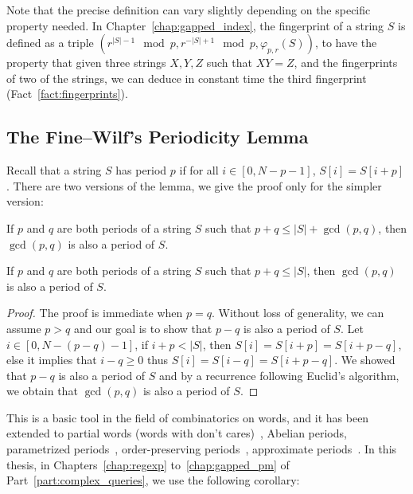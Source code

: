 Note that the precise definition can vary slightly depending on the specific property needed. In Chapter~\ref{chap:gapped_index}, the fingerprint of a string $S$ is defined as a triple $(r^{|S|-1} \mod p, r^{-|S|+1} \mod p, \varphi_{p,r}(S))$, to have the property that given three strings $X,Y,Z$ such that $XY =Z$, and the fingerprints of two of the strings, we can deduce in constant time the third fingerprint (Fact~\ref{fact:fingerprints}). 


\subsection{The Fine--Wilf's Periodicity Lemma}\label{sec:prelim:FW}

Recall that a string $S$ has period $p$ if for all $i \in [0,N-p-1]$, $S[i]=S[i+p]$. There are two versions of the lemma, we give the proof only for the simpler version:

\begin{lemma*}
If $p$ and $q$ are both periods of a string $S$ such that $p+q \leq |S|+\gcd(p,q)$, then $\gcd(p,q)$ is also a period of $S$.
\end{lemma*}

\begin{lemma*}
    If $p$ and $q$ are both periods of a string $S$ such that $p+q \leq |S|$, then $\gcd(p,q)$ is also a period of $S$.
\end{lemma*}
\begin{proof}
    The proof is immediate when $p=q$. Without loss of generality, we can assume $p > q$ and our goal is to show that $p-q$ is also a period of $S$. Let $i\in[0,N-(p-q)-1]$, if $i+p < |S|$, then $S[i]=S[i+p]=S[i+p-q]$, else it implies that $i-q \geq 0$ thus $S[i] = S[i-q] = S[i+p-q]$. We showed that $p-q$ is also a period of $S$ and by a recurrence following Euclid's algorithm, we obtain that $\gcd(p,q)$ is also a period of $S$.
\end{proof}


This is a basic tool in the field of combinatorics on words, and it has been extended to partial words (words with don't cares)~\cite{Berstel1999,Blanchet-Sadri2008,Blanchet-Sadri2002,Shur2004,Shur2001,Idiatulina2014,Kociumaka2022},
Abelian periods\cite{Constantinescu2006,Blanchet-Sadri2013}, parametrized periods~\cite{Apostolico2008},
order-preserving periods~\cite{Matsuoka2016,Gourdel2020}, approximate periods~\cite{Amir2010,Amir2012,Amir2015}.
In this thesis, in Chapters~\ref{chap:regexp} to~\ref{chap:gapped_pm} of Part~\ref{part:complex_queries}, we use the following corollary:

